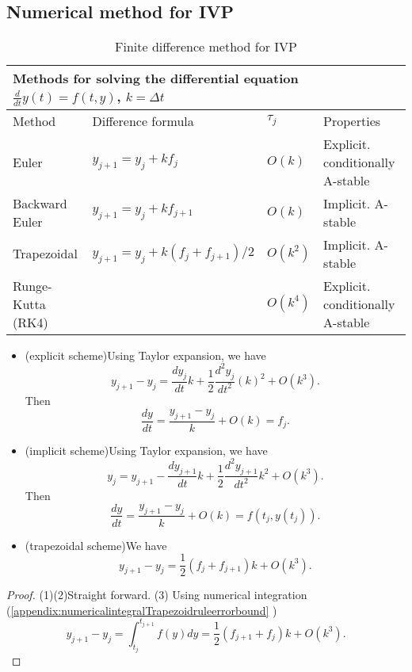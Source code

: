 \begin{refsection}
\subsection{Numerical method for IVP}
\begin{table}[h]
\centering
\caption{Finite difference method for IVP \cite[16]{holmes2007introduction}}
\begin{tabular}{|l|l|l|l|}
\hline
\multicolumn{4}{|l|}{ Methods for solving the differential equation
$\frac{d}{dt}y(t) = f(t,y)$, $k=\Delta t $} \\ \hline
 Method    &  Difference formula &  $\tau_j$   &    Properties \\ \hline
Euler     &  $y_{j+1} = y_j + kf_j$    &    $O(k)$ &    Explicit. conditionally A-stable \\ \hline
Backward Euler     & $y_{j+1} = y_j + kf_{j+1}$     & $O(k)$    &    Implicit. A-stable \\ \hline
Trapezoidal     &   $y_{j+1} = y_j + k(f_j+f_{j+1})/2$  &   $O(k^2)$  &   Implicit. A-stable  \\ \hline
Runge-Kutta (RK4)     &      &  $O(k^4)$   &  Explicit. conditionally A-stable   \\ \hline
\end{tabular}
\end{table}

\begin{lemma}\label{ch:numerical-methods:th:initalvalueproblemnumericalschememaccuracyanalysis}\hfill
\begin{itemize}
	\item (explicit scheme)Using Taylor expansion, we have
	$$y_{j+1} - y_{j} = \frac{dy_j}{dt}k + \frac{1}{2}\frac{d^2y_j}{dt^2}(k)^2 + O(k^3).$$
	Then
	$$\frac{dy}{dt} = \frac{y_{j+1} - y_{j}}{k} + O(k) = f_j.$$
	\item (implicit scheme)Using Taylor expansion, we have
	$$y_{j} = y_{j+1} - \frac{dy_{j+1}}{dt}k + \frac{1}{2}\frac{d^2y_{j+1}}{dt^2}k^2 + O(k^3).$$
	Then
	$$\frac{dy}{dt} = \frac{y_{j+1} - y_{j}}{k} + O(k) = f(t_j,y(t_{j})).$$
	
	\item (trapezoidal scheme)We have
	$$y_{j+1} - y_{j} = \frac{1}{2}(f_j + f_{j+1}) k + O(k^3).$$
\end{itemize}
\end{lemma}
\begin{proof}
(1)(2)Straight forward.
(3) Using numerical integration (\autoref{appendix:numericalintegralTrapezoidruleerrorbound} \cite[19]{holmes2007introduction})
$$y_{j+1} - y_j=\int_{t_j}^{t_{j+1}} f(y)dy = \frac{1}{2}(f_{j+1} + f_j)k + O(k^3).$$
\end{proof}



\end{refsection}

